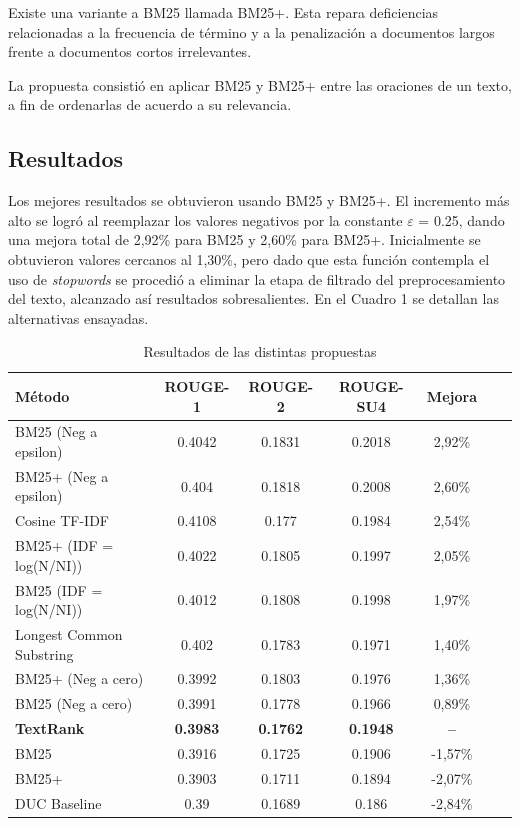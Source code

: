 \documentclass{llncs}
\begin{document}
Existe una variante a BM25 llamada BM25+. Esta repara deficiencias relacionadas a la frecuencia de término y a la penalización a documentos largos frente a documentos cortos irrelevantes.

La propuesta consistió en aplicar BM25 y BM25+ entre las oraciones de un texto, a fin de ordenarlas de acuerdo a su relevancia.


\subsection{Resultados}
Los mejores resultados se obtuvieron usando BM25 y BM25+. El incremento más alto se logró al reemplazar los valores negativos por la constante $\varepsilon$ = 0.25, dando una mejora total de 2,92\% para BM25 y 2,60\% para BM25+. Inicialmente se obtuvieron valores cercanos al 1,30\%, pero dado que esta función contempla el uso de \textit{stopwords} se procedió a eliminar la etapa de filtrado del preprocesamiento del texto, alcanzado así resultados sobresalientes. En el Cuadro 1 se detallan las alternativas ensayadas.

\begin{table}
\caption{Resultados de las distintas propuestas}
\begin{center}
\begin{tabular}{l*{5}{c}r}
\hline
\rule{0pt}{12pt}
Método & ROUGE-1 & ROUGE-2 & ROUGE-SU4 & Mejora \\[2pt]
\hline\rule{0pt}{12pt}\mbox{}\par\nobreak
BM25 (Neg a epsilon) & 0.4042 & 0.1831 & 0.2018 & 2,92\% \\
BM25+ (Neg a epsilon) & 0.404 & 0.1818 & 0.2008 & 2,60\% \\
Cosine TF-IDF & 0.4108 & 0.177 & 0.1984 & 2,54\% \\
BM25+ (IDF = log(N/NI)) & 0.4022 & 0.1805 & 0.1997 & 2,05\% \\ 
BM25 (IDF = log(N/NI)) & 0.4012 & 0.1808 & 0.1998 & 1,97\% \\ 
Longest Common Substring & 0.402 & 0.1783 & 0.1971 & 1,40\% \\
BM25+ (Neg a cero) & 0.3992 & 0.1803 & 0.1976 & 1,36\% \\ 
BM25 (Neg a cero) & 0.3991 & 0.1778 & 0.1966 & 0,89\% \\
\textbf{TextRank} & \textbf{0.3983} & \textbf{0.1762} & \textbf{0.1948} & \textbf{--}\\
BM25 & 0.3916 & 0.1725 & 0.1906 & -1,57\% \\
BM25+ & 0.3903 & 0.1711 & 0.1894 & -2,07\% \\
DUC Baseline & 0.39 & 0.1689 & 0.186 & -2,84\% \\ [2pt]
\hline
\end{tabular}
\end{center}
\end{table}
\end{document}
